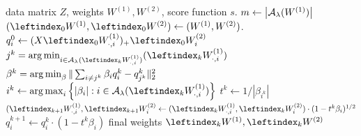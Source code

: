 \begin{algorithm}[tb]
	\caption{Approximate ReLU Pruning}
	\label{alg:pruning-solutions-nn}
	\begin{algorithmic}
		 data matrix \( Z \), weights \( W^{(1)}, W^{(2)} \),
		score function \( s \).
		\STATE \( m \gets \left\vert {\mathcal{A}_{\lambda}}(W^{(1)})\right\vert \)
        \STATE \( (\leftindex_0{W}^{(1)}, \leftindex_0{W}^{(2)}) \gets (W^{(1)}, W^{(2)}) \).
        \STATE \( q^0_i \gets (X \leftindex_0{W}^{(1)}_{\cdot, i})_+ \leftindex_0{W}^{(2)}_{i} \)
		\STATE \( j^k = \argmin_{i \in \act(\leftindex_k{W}^{(1)}_{\cdot, i})} (\leftindex_k{W}^{(1)}_{\cdot, i}) \)
		\STATE \( \beta^k = \mathop{\rm arg\,min}_{\beta} \| \sum_{i \neq j^k} \beta_{i} q^k_i - q_{j^k}^k\|_2^2 \)
		\STATE \( i^k \gets \argmax_{i} \cbr{|\beta_i| : i \in \act(\leftindex_k{W}^{(1)}_{\cdot, i})}  \)
		\STATE \( t^k \gets 1/|\beta_{i^k}| \)
        \STATE \( (\leftindex_{k+1}{W}^{(1)}_{\cdot, i}, \leftindex_{k+1}{W}^{(2)}_{i} \gets (\leftindex_k{W}^{(1)}_{\cdot, i}, \leftindex_{k}{W}^{(2)}_{i})
		\cdot (1 - t^k \beta_i)^{1/2} \)
		\STATE \( q^{k+1}_i \gets q_i^{k} \cdot (1 - t^k \beta_i) \)
		\ENDFOR
         final weights \( \leftindex_{k}{W}^{(1)}, \leftindex_{k}{W}^{(2)} \)
	\end{algorithmic}
\end{algorithm}

